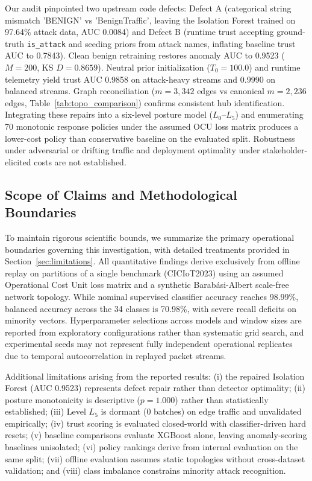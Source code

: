 \documentclass[journal,10pt,onecolumn]{IEEEtran}
\begin{document}
Our audit pinpointed two upstream code defects: Defect A (categorical string mismatch 'BENIGN' vs 'BenignTraffic', leaving the Isolation Forest trained on 97.64\% attack data, AUC 0.0084) and Defect B (runtime trust accepting ground-truth \texttt{is\_attack} and seeding priors from attack names, inflating baseline trust AUC to 0.7843). Clean benign retraining restores anomaly AUC to 0.9523 ($M=200$, KS $D=0.8659$). Neutral prior initialization ($T_0=100.0$) and runtime telemetry yield trust AUC 0.9858 on attack-heavy streams and 0.9990 on balanced streams. Graph reconciliation ($m=3, 342$ edges vs canonical $m=2, 236$ edges, Table~\ref{tab:topo_comparison}) confirms consistent hub identification. Integrating these repairs into a six-level posture model ($L_0$--$L_5$) and enumerating 70 monotonic response policies under the assumed OCU loss matrix produces a lower-cost policy than conservative baseline on the evaluated split. Robustness under adversarial or drifting traffic and deployment optimality under stakeholder-elicited costs are not established.

\subsection{Scope of Claims and Methodological Boundaries}
To maintain rigorous scientific bounds, we summarize the primary operational boundaries governing this investigation, with detailed treatments provided in Section~\ref{sec:limitations}. All quantitative findings derive exclusively from offline replay on partitions of a single benchmark (CICIoT2023) using an assumed Operational Cost Unit loss matrix and a synthetic Barabási-Albert scale-free network topology. While nominal supervised classifier accuracy reaches 98.99\%, balanced accuracy across the 34 classes is 70.98\%, with severe recall deficits on minority vectors. Hyperparameter selections across models and window sizes are reported from exploratory configurations rather than systematic grid search, and experimental seeds may not represent fully independent operational replicates due to temporal autocorrelation in replayed packet streams.

Additional limitations arising from the reported results: (i) the repaired Isolation Forest (AUC 0.9523) represents defect repair rather than detector optimality; (ii) posture monotonicity is descriptive ($p=1.000$) rather than statistically established; (iii) Level $L_5$ is dormant (0 batches) on edge traffic and unvalidated empirically; (iv) trust scoring is evaluated closed-world with classifier-driven hard resets; (v) baseline comparisons evaluate XGBoost alone, leaving anomaly-scoring baselines unisolated; (vi) policy rankings derive from internal evaluation on the same split; (vii) offline evaluation assumes static topologies without cross-dataset validation; and (viii) class imbalance constrains minority attack recognition.
\end{document}
